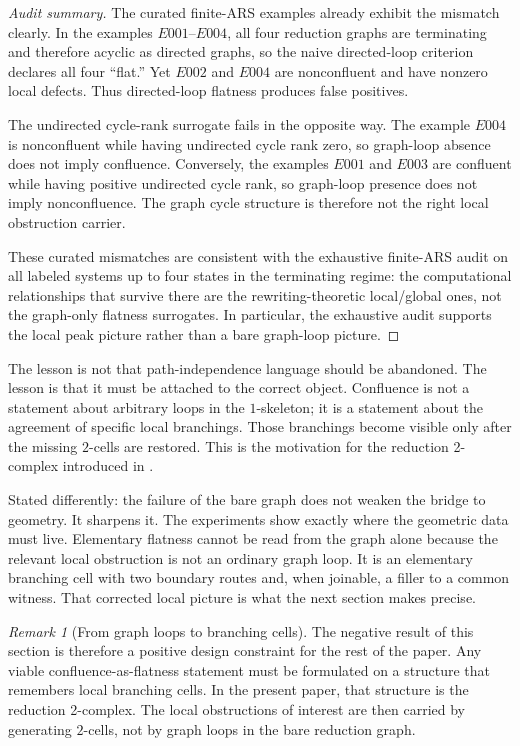 \documentclass[11pt]{article}
\numberwithin{equation}{section}
\theoremstyle{definition}
\theoremstyle{remark}
\newtheorem{remark}[theorem]{Remark}
\begin{document}
\begin{proof}[Audit summary]
The curated finite-ARS examples already exhibit the mismatch clearly. In the examples $E001$--$E004$, all four reduction graphs are terminating and therefore acyclic as directed graphs, so the naive directed-loop criterion declares all four ``flat.'' Yet $E002$ and $E004$ are nonconfluent and have nonzero local defects. Thus directed-loop flatness produces false positives.

The undirected cycle-rank surrogate fails in the opposite way. The example $E004$ is nonconfluent while having undirected cycle rank zero, so graph-loop absence does not imply confluence. Conversely, the examples $E001$ and $E003$ are confluent while having positive undirected cycle rank, so graph-loop presence does not imply nonconfluence. The graph cycle structure is therefore not the right local obstruction carrier.

These curated mismatches are consistent with the exhaustive finite-ARS audit on all labeled systems up to four states in the terminating regime: the computational relationships that survive there are the rewriting-theoretic local/global ones, not the graph-only flatness surrogates. In particular, the exhaustive audit supports the local peak picture rather than a bare graph-loop picture.
\end{proof}

The lesson is not that path-independence language should be abandoned. The lesson is that it must be attached to the correct object. Confluence is not a statement about arbitrary loops in the $1$-skeleton; it is a statement about the agreement of specific local branchings. Those branchings become visible only after the missing $2$-cells are restored. This is the motivation for the reduction 2-complex introduced in .

Stated differently: the failure of the bare graph does not weaken the bridge to geometry. It sharpens it. The experiments show exactly where the geometric data must live. Elementary flatness cannot be read from the graph alone because the relevant local obstruction is not an ordinary graph loop. It is an elementary branching cell with two boundary routes and, when joinable, a filler to a common witness. That corrected local picture is what the next section makes precise.

\begin{remark}[From graph loops to branching cells]
\label{rem:graph-loops-to-branching-cells}
The negative result of this section is therefore a positive design constraint for the rest of the paper. Any viable confluence-as-flatness statement must be formulated on a structure that remembers local branching cells. In the present paper, that structure is the reduction 2-complex. The local obstructions of interest are then carried by generating $2$-cells, not by graph loops in the bare reduction graph.
\end{remark}
\end{document}
